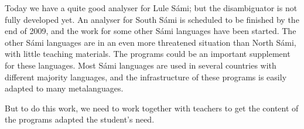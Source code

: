 \documentclass[a4paper,12pt]{article}
\begin{document}
Today we have a quite good analyser for Lule Sámi; but the disambiguator is not fully developed yet. An analyser for South Sámi is scheduled to be finished by the end of 2009, and the work for some other Sámi languages have been started. The other Sámi languages are in an even more threatened situation than North Sámi, with little teaching materials. The programs could be an important supplement for these languages. Most Sámi languages are used in several countries with different majority languages, and the infrastructure of these programs is easily adapted to many metalanguages.

But to do this work, we need to work together with teachers to get the content of the programs adapted the student's need.


\newpage

\par



	
\end{document}
